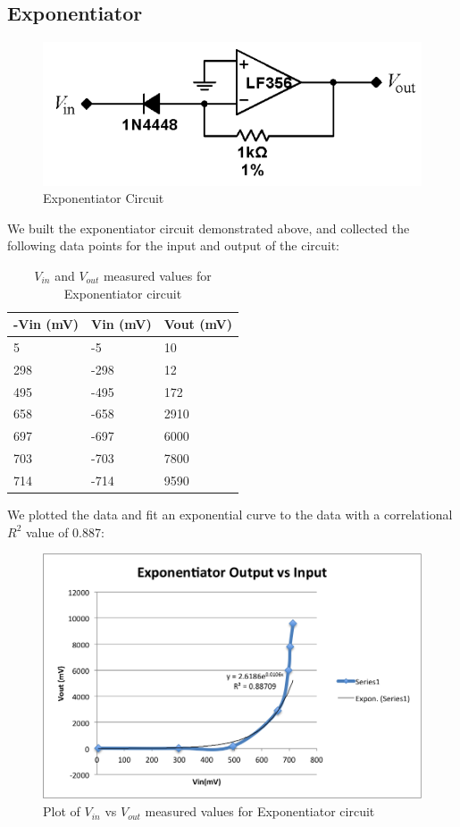 \documentclass{article}
\begin{document}
    \subsection{Exponentiator}
    \begin{figure}[H]
        \centering
        \includegraphics[scale = 0.6]{8.png}
        \caption{Exponentiator Circuit \cite{lab7}}
        \label{fig:my_label}
    \end{figure}
    We built the exponentiator circuit demonstrated above, and collected the following data points for the input and output of the circuit:
    \begin{table}[H]
        \centering
        \caption{$V_{in}$ and $V_{out}$ measured values for Exponentiator circuit}
        \label{my-label}
        \begin{tabular}{lll}
        \textbf{-Vin (mV)} & \textbf{Vin (mV)} & \textbf{Vout (mV)} \\ \hline
        5 & -5 & 10 \\
        298 & -298 & 12 \\
        495 & -495 & 172 \\
        658 & -658 & 2910 \\
        697 & -697 & 6000 \\
        703 & -703 & 7800 \\
        714 & -714 & 9590
        \end{tabular}
        \end{table}
    We plotted the data and fit an exponential curve to the data with a correlational $R^{2}$ value of 0.887:
    \begin{figure}[H]
        \centering
        \includegraphics[scale = 0.7]{8a.png}
        \caption{Plot of $V_{in}$ vs $V_{out}$ measured values for Exponentiator circuit}
        \label{fig:my_label}
    \end{figure}
\end{document}
